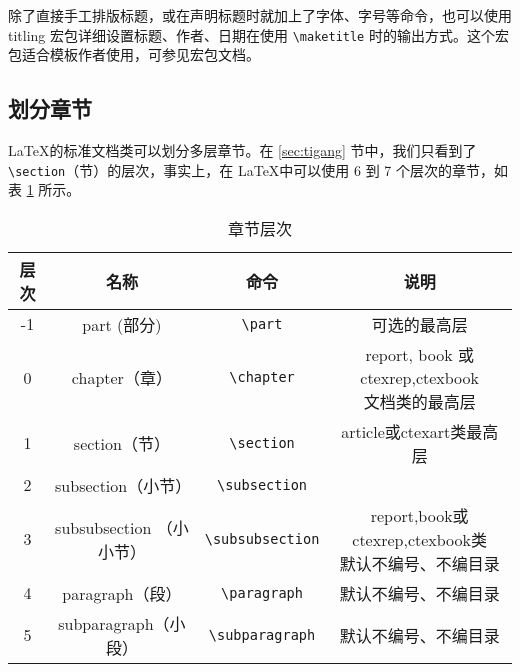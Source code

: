 除了直接手工排版标题，或在声明标题时就加上了字体、字号等命令，也可以使用 titling 宏包详细设置标题、作者、日期在使用 \verb|\maketitle| 时的输出方式。这个宏包适合模板作者使用，可参见宏包文档。

\subsection{划分章节}

\LaTeX 的标准文档类可以划分多层章节。在 \ref{sec:tigang} 节中，我们只看到了 \verb|\section|（节）的层次，事实上，在 \LaTeX 中可以使用 6 到 7 个层次的章节，如表 \ref{tab:section} 所示。

\begin{table}[H]
    \centering
    \caption{章节层次}
    \label{tab:section}
    \begin{tabular}{cccc}
        \toprule
        层次 & 名称 & 命令 & 说明 \\ 
        \midrule
        -1 & part (部分) & \verb|\part| & 可选的最高层 \\ 
        0 & chapter（章） & \verb|\chapter| 
        & \makecell[t]{report, book 或 ctexrep,ctexbook\\ 文档类的最高层} \\ 
        1 & section（节） & \verb|\section| & article或ctexart类最高层 \\
        2 & subsection（小节） & \verb|\subsection| & \\ 
        3 & subsubsection （小小节）&  \verb|\subsubsection| & \makecell[t]{report,book或ctexrep,ctexbook类\\默认不编号、不编目录} \\ 
        4 & paragraph（段） & \verb|\paragraph| & 默认不编号、不编目录 \\
        5 & subparagraph（小段） & \verb|\subparagraph|&默认不编号、不编目录 \\ 
\bottomrule
    \end{tabular}
\end{table}

